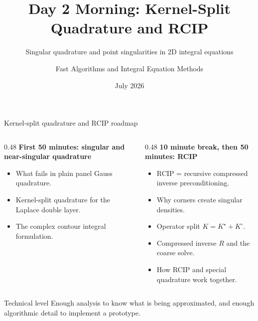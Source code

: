 \documentclass[aspectratio=169,11pt]{beamer}
\title{Day 2 Morning: Kernel-Split Quadrature and RCIP}
\subtitle{Singular quadrature and point singularities in 2D integral equations}
\author{Fast Algorithms and Integral Equation Methods}
\institute{AMSS Summer Course}
\date{July 2026}
\begin{document}
\begin{frame}
  \titlepage
\end{frame}

\begin{frame}{Kernel-split quadrature and RCIP roadmap}
\small
\begin{columns}[T,totalwidth=\textwidth]
\begin{column}{0.48\textwidth}
\textbf{First 50 minutes: singular and near-singular quadrature}
\begin{itemize}
  \item What fails in plain panel Gauss quadrature.
  \item Kernel-split quadrature for the Laplace double layer.
  \item The complex contour integral formulation.
\end{itemize}
\end{column}
\begin{column}{0.48\textwidth}
\textbf{10 minute break, then 50 minutes: RCIP}
\begin{itemize}
  \item RCIP = recursive compressed inverse preconditioning.
  \item Why corners create singular densities.
  \item Operator split $K=K^\star+K^\circ$.
  \item Compressed inverse $R$ and the coarse solve.
  \item How RCIP and special quadrature work together.
\end{itemize}
\end{column}
\end{columns}

\vspace{3mm}
\begin{block}{Technical level}
Enough analysis to know what is being approximated, and enough algorithmic detail to implement a prototype.
\end{block}
\end{frame}
\end{document}
